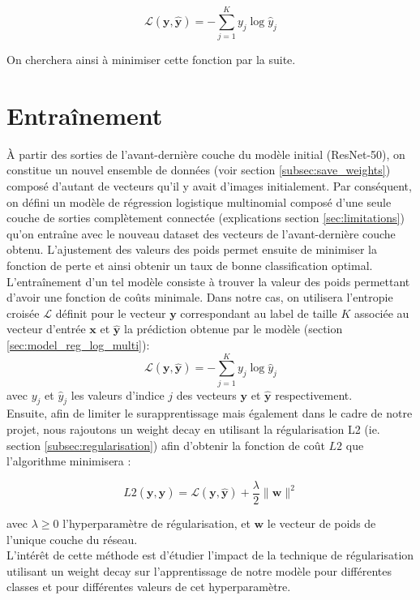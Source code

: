 \documentclass[12pt,english, openany]{book}
\begin{document}
$$
\mathcal{L}(\mathbf{y}, \mathbf{\hat{y}}) = - \sum_{j = 1}^{K} y_{j} \log \hat{y}_{j}
$$

On cherchera ainsi à minimiser cette fonction par la suite.

\section{Entraînement}

À partir des sorties de l'avant-dernière couche du modèle initial (ResNet-50), on constitue un nouvel ensemble de données (voir section \ref{subsec:save_weights}) composé d'autant de vecteurs qu'il y avait d'images initialement. Par conséquent, on défini un modèle de régression logistique multinomial composé d'une seule couche de sorties complètement connectée (explications section \ref{sec:limitations}) qu'on entraîne avec le nouveau dataset des vecteurs de l'avant-dernière couche obtenu. L'ajustement des valeurs des poids permet ensuite de minimiser la fonction de perte et ainsi obtenir un taux de bonne classification optimal.\\

L'entraînement d'un tel modèle consiste à trouver la valeur des poids permettant d'avoir une fonction de coûts minimale. Dans notre cas, on utilisera l'entropie croisée $\mathcal{L}$ définit pour le vecteur $\mathbf{y}$ correspondant au label de taille $K$ associée au vecteur d'entrée $\mathbf{x}$ et $\mathbf{\hat{y}}$ la prédiction obtenue par le modèle (section \ref{sec:model_reg_log_multi}):
$$
\mathcal{L}(\mathbf{y}, \mathbf{\hat{y}}) = - \sum_{j = 1}^{K} y_{j} \log \hat{y}_{j}
$$
avec $y_{j}$ et $\hat{y}_{j}$ les valeurs d'indice $j$ des vecteurs $\mathbf{y}$ et $\mathbf{\hat{y}}$ respectivement.\\

Ensuite, afin de limiter le surapprentissage mais également dans le cadre de notre projet, nous rajoutons un weight decay en utilisant la régularisation L2 (ie. section \ref{subsec:regularisation}) afin d'obtenir la fonction de coût $L2$ que l'algorithme minimisera : 

$$
L2(\mathbf{y}, \mathbf{\hat{y}}) = \mathcal{L}(\mathbf{y}, \mathbf{\hat{y}}) + \frac{\lambda }{2}\lVert \mathbf{w}\rVert ^2
$$

avec $\lambda \geq 0$ l'hyperparamètre de régularisation, et $\mathbf{w}$ le vecteur de poids de l'unique couche du réseau.\\

L'intérêt de cette méthode est d'étudier l'impact de la technique de régularisation utilisant un weight decay sur l'apprentissage de notre modèle pour différentes classes et pour différentes valeurs de cet hyperparamètre.\\
\end{document}
